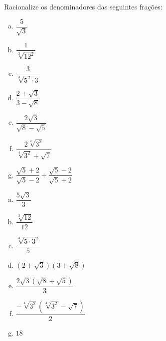 \begin{secExercicios}
\begin{exer}
Racionalize os denominadores das seguintes frações:
\begin{multicols}{2}
\begin{enumerate}[a)]
\item $\dfrac{5}{\sqrt{3}}$
\item $\dfrac{1}{\sqrt[3]{12^2}}$
\item $\dfrac{3}{\sqrt[3]{5^2 \cdot 3}}$
\item $\dfrac{2 + \sqrt{3}}{3 - \sqrt{8}}$
\item $\dfrac{2\sqrt{3}}{\sqrt{8} - \sqrt{5}}$
\item $\dfrac{2 \sqrt[4]{3^2}}{\sqrt[4]{3^2} + \sqrt{7}}$
\item $\dfrac{\sqrt{5} + 2}{\sqrt{5} - 2} + \dfrac{\sqrt{5} - 2}{\sqrt{5} + 2}$
\end{enumerate}
\end{multicols}
\end{exer}
\begin{resp}
 \begin{multicols}{2}
\begin{enumerate}[a)]
\item $\dfrac{5 \sqrt{3}}{3}$
\item $\dfrac{\sqrt[3]{12}}{12}$
\item $\dfrac{\sqrt[3]{5 \cdot 3^2}}{5}$
\item $(2 + \sqrt{3}) (3 + \sqrt{8})$
\item $\dfrac{2\sqrt{3} (\sqrt{8} + \sqrt{5})}{3}$
\item $\dfrac{- \sqrt[4]{3^2} (\sqrt[4]{3^2} - \sqrt{7})}{2}$
\item $18$
\end{enumerate}
\end{multicols}
\end{resp}


\end{secExercicios}

